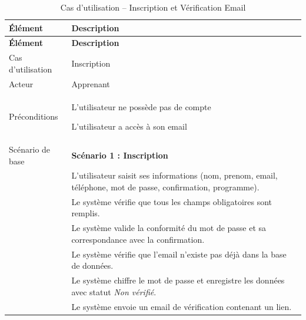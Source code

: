 \small %
\begin{longtable}{|l|p{12cm}|}

\caption{Cas d’utilisation – Inscription et Vérification Email}
\label{tab:inscription_email} \\
\hline
\textbf{Élément} & \textbf{Description} \\
\hline
\endfirsthead
\hline
\textbf{Élément} & \textbf{Description} \\
\hline
\endhead

Cas d’utilisation & 
Inscription \\
\hline
Acteur &  Apprenant \\
\hline
Préconditions & 

L’utilisateur ne possède pas de compte

L’utilisateur a accès à son email\\

\hline
Scénario de base & 
\textbf{Scénario 1 : Inscription} \\
& L’utilisateur saisit ses informations (nom, prenom, email, téléphone, mot de passe, confirmation, programme). \\
& Le système vérifie que tous les champs obligatoires sont remplis. \\
& Le système valide la conformité du mot de passe et sa correspondance avec la confirmation. \\
& Le système vérifie que l'email n'existe pas déjà dans la base de données. \\
& Le système chiffre le mot de passe et enregistre les données avec statut \textit{Non vérifié}. \\
& Le système envoie un email de vérification contenant un lien. \\


\end{longtable}
